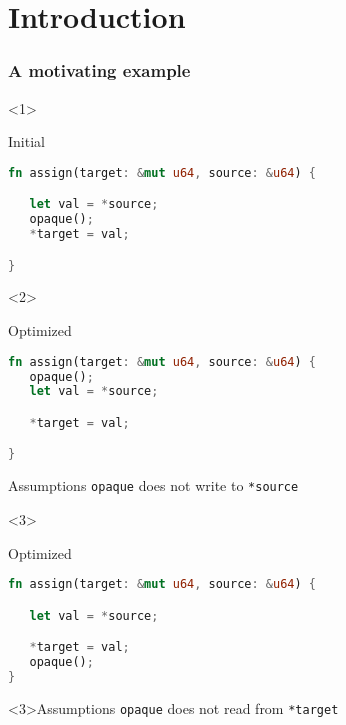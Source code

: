 \begin{frame}
    \titlepage
\end{frame}

\section{Introduction}

\begin{frame}[fragile,t]
    \frametitle{A motivating example}
    \begin{onlyenv}<1>
        \begin{block}{Initial}
            \begin{minipage}{\textwidth}
                \begin{lstlisting}[language=rust]
fn assign(target: &mut u64, source: &u64) {

   let val = *source;
   opaque();
   *target = val;

}
                \end{lstlisting}
            \end{minipage}
        \end{block}
    \end{onlyenv}

    \begin{onlyenv}<2>
        \begin{block}{Optimized}
            \begin{minipage}{\textwidth}
                \begin{lstlisting}[language=rust, escapechar=!]
fn assign(target: &mut u64, source: &u64) {
   opaque();
   let val = *source;

   *target = val;

}
                \end{lstlisting}
            \end{minipage}
        \end{block}
        \begin{block}{Assumptions}
            \texttt{opaque} does not write to \texttt{*source}
        \end{block}
    \end{onlyenv}

    \begin{onlyenv}<3>
        \begin{block}{Optimized}
            \begin{minipage}{\textwidth}
                \begin{lstlisting}[language=rust, escapechar=!]
fn assign(target: &mut u64, source: &u64) {

   let val = *source;

   *target = val;
   opaque();
}
                \end{lstlisting}
            \end{minipage}
        \end{block}
        \begin{block}<3>{Assumptions}
            \texttt{opaque} does not read from \texttt{*target}
        \end{block}
    \end{onlyenv}
\end{frame}

